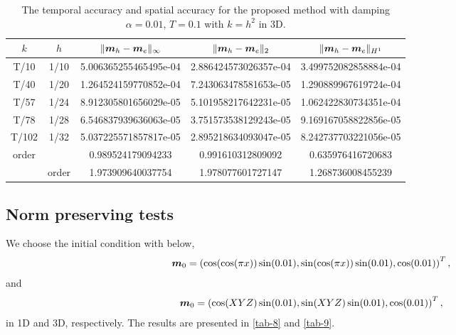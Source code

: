 \documentclass[preprint,times,3p]{elsarticle}
\def\m{\mbox{\boldmath $m$}}
\begin{document}
\begin{table}[htbp]
	\centering
	\caption{The temporal accuracy and spatial accuracy for the proposed method with damping $\alpha=0.01$, $T=0.1$ with $k=h^2$ in 3D. }\label{tab-a-10-time-3D-Q-2}
	\begin{tabular}{|c|c|c|c|c|}
		\hline
		$k$&$h$ & $\|\m_h-\m_e\|_\infty$ & $\|\m_h-\m_e\|_2$ &$\|\m_h-\m_e\|_{H^1}$ \\
	\hline
	T/10&1/10&5.006365255465495e-04&2.886424573026357e-04&3.499752082858884e-04 \\
	T/40 &1/20&1.264524159770852e-04&7.243063478581653e-05&1.290889967619724e-04 \\
	T/57 &1/24&8.912305801656029e-05&5.101958217642231e-05&1.062422830734351e-04\\
	T/78&1/28&6.546837939636063e-05&3.751573538129243e-05&9.169167058822856e-05 \\
	T/102 &1/32&5.037225571857817e-05&2.895218634093047e-05&8.242737703221056e-05 \\
	\hline 
	order &&0.989524179094233&0.991610312809092&0.635976416720683\\
		\hline
	&	order &1.973909640037754&1.978077601727147&1.268736008455239\\
		\hline
	\end{tabular}
\end{table}

\subsection{Norm preserving tests}
We choose the initial condition with below,
\begin{align*}
    \m_0=\left(\cos(\cos(\pi x))\sin (0.01), \sin(\cos(\pi x))\sin (0.01), \cos (0.01)\right)^T,
\end{align*}
and \begin{align*}
\m_0=\left(\cos(XYZ)\sin (0.01), \sin(XYZ)\sin (0.01), \cos (0.01)\right)^T,
\end{align*}
in 1D and 3D, respectively. The results are presented in \cref{tab-8} and \cref{tab-9}.
\end{document}
